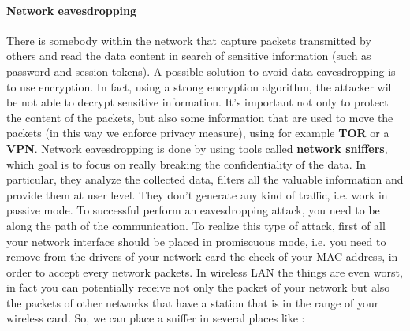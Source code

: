 \documentclass[11pt]{article}
\begin{document}
\paragraph{Network eavesdropping} There is somebody within the network that capture packets transmitted by others and read the data content in search of sensitive information (such as password and session tokens). A possible solution to avoid data eavesdropping is to use encryption. In fact, using a strong encryption algorithm, the attacker will be not able to decrypt sensitive information. It's important not only to protect the content of the packets, but also some information that are used to move the packets (in this way we enforce privacy measure), using for example \textbf{TOR} or a \textbf{VPN}. Network eavesdropping is done by using tools called \textbf{network sniffers}, which goal is to focus on really breaking the confidentiality of the data. In particular, they analyze the collected data, filters all the valuable information and provide them at user level. They don't generate any kind of traffic, i.e. work in passive mode. To successful perform an eavesdropping attack, you need to be along the path of the communication. To realize this type of attack, first of all your network interface should be placed in promiscuous mode, i.e. you need to remove from the drivers of your network card the check of your MAC address, in order to accept every network packets. In wireless LAN the things are even worst, in fact you can potentially receive not only the packet of your network but also the packets of other networks that have a station that is in the range of your wireless card. So, we can place a sniffer in several places like :
\end{document}
